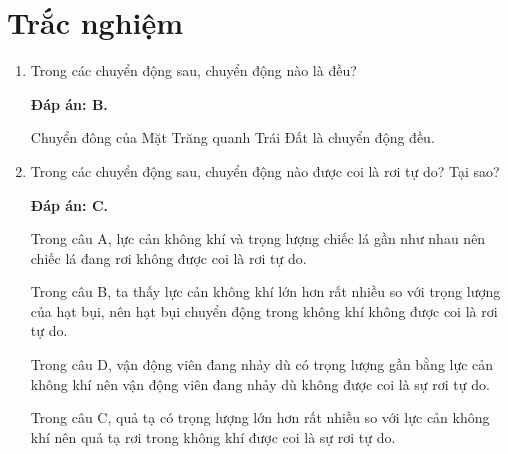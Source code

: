\setcounter{section}{0}
\section{Trắc nghiệm}
\begin{enumerate}[label=\bfseries Câu \arabic*:]
	\item {}
	
	
	{Trong các chuyển động sau, chuyển động nào là đều?
	}
	
	\hideall
	{		\textbf{Đáp án: B.}
		
		Chuyển đông của Mặt Trăng quanh Trái Đất là chuyển động đều.
		
	}
		\item {}
	
	
	{Trong các chuyển động sau, chuyển động nào được coi là rơi tự do? Tại sao?
		
		
	}
	
	\hideall
	{\textbf{Đáp án: C.}
		
		Trong câu A, lực cản không khí và trọng lượng chiếc lá gần như nhau nên chiếc lá đang rơi không được coi là rơi tự do.
		
		Trong câu B, ta thấy lực cản không khí lớn hơn rất nhiều so với trọng lượng của hạt bụi, nên hạt bụi chuyển động trong không khí không được coi là rơi tự do.
		
		Trong câu D, vận động viên đang nhảy dù có trọng lượng gần bằng lực cản không khí nên vận động viên đang nhảy dù không được coi là sự rơi tự do.
		
		Trong câu C, quả tạ có trọng lượng lớn hơn rất nhiều so với lực cản không khí nên quả tạ rơi trong không khí được coi là sự rơi tự do.
	
}
\end{enumerate}
